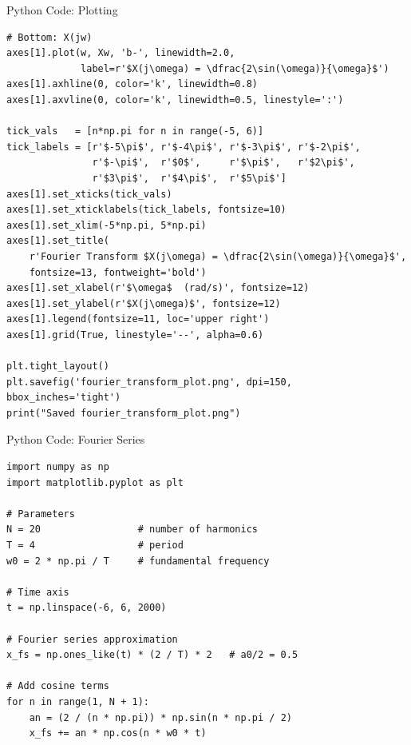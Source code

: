 \documentclass{beamer}
\begin{document}
\begin{frame}[fragile]{Python Code: Plotting}


\begin{lstlisting}
# Bottom: X(jw) 
axes[1].plot(w, Xw, 'b-', linewidth=2.0,
             label=r'$X(j\omega) = \dfrac{2\sin(\omega)}{\omega}$')
axes[1].axhline(0, color='k', linewidth=0.8)
axes[1].axvline(0, color='k', linewidth=0.5, linestyle=':')

tick_vals   = [n*np.pi for n in range(-5, 6)]
tick_labels = [r'$-5\pi$', r'$-4\pi$', r'$-3\pi$', r'$-2\pi$',
               r'$-\pi$',  r'$0$',     r'$\pi$',   r'$2\pi$',
               r'$3\pi$',  r'$4\pi$',  r'$5\pi$']
axes[1].set_xticks(tick_vals)
axes[1].set_xticklabels(tick_labels, fontsize=10)
axes[1].set_xlim(-5*np.pi, 5*np.pi)
axes[1].set_title(
    r'Fourier Transform $X(j\omega) = \dfrac{2\sin(\omega)}{\omega}$',
    fontsize=13, fontweight='bold')
axes[1].set_xlabel(r'$\omega$  (rad/s)', fontsize=12)
axes[1].set_ylabel(r'$X(j\omega)$', fontsize=12)
axes[1].legend(fontsize=11, loc='upper right')
axes[1].grid(True, linestyle='--', alpha=0.6)

plt.tight_layout()
plt.savefig('fourier_transform_plot.png', dpi=150, bbox_inches='tight')
print("Saved fourier_transform_plot.png")
\end{lstlisting} 
\end{frame}

\begin{frame}[fragile]{Python Code: Fourier Series}


\begin{lstlisting}
import numpy as np
import matplotlib.pyplot as plt

# Parameters
N = 20                 # number of harmonics
T = 4                  # period
w0 = 2 * np.pi / T     # fundamental frequency

# Time axis
t = np.linspace(-6, 6, 2000)

# Fourier series approximation
x_fs = np.ones_like(t) * (2 / T) * 2   # a0/2 = 0.5

# Add cosine terms
for n in range(1, N + 1):
    an = (2 / (n * np.pi)) * np.sin(n * np.pi / 2)
    x_fs += an * np.cos(n * w0 * t)

\end{lstlisting} 
\end{frame}
\end{document}
